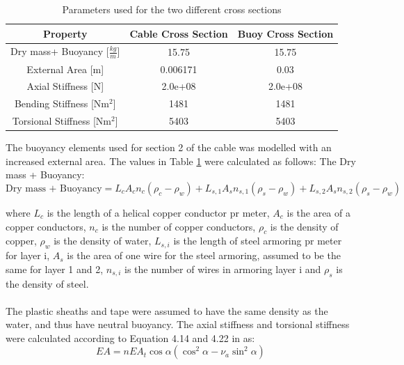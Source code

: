 \begin{table} [H]
\centering
\begin{tabular}{ |c|c|c|}
\hline
Property& Cable Cross Section & Buoy Cross Section \\
 \hline
 \hline
Dry mass+ Buoyancy [$\frac{kg}{m}$] & 15.75 & 15.75\\
External Area [m]& 0.006171 & 0.03\\
Axial Stiffness [N] & 2.0e+08 & 2.0e+08\\
Bending Stiffness [Nm$^2$] & 1481 & 1481\\
Torsional Stiffness [Nm$^2$] & 5403 & 5403\\
 \hline
\end{tabular}
\caption{Parameters used for the two different cross sections}
\label{table:crosssima}
\end{table}
\noindent The buoyancy elements used for section 2 of the cable was modelled with an increased external area. The values in Table \ref{table:crosssima} were calculated as follows:\newline
\newline 
\noindent The Dry mass + Buoyancy: 
\begin{equation}
\text{Dry mass + Buoyancy}=L_{c} A_cn_c (\rho_c-\rho_w) + L_{s,1} A_{s}n_{s,1} (\rho_s-\rho_w)+L_{s,2} A_{s}n_{s,2} (\rho_s-\rho_w)
\end{equation}

\noindent where $L_c$ is the length of a helical copper conductor pr meter, $A_c$ is the area of a copper conductors, $n_c$ is the number of copper conductors, $\rho_c$ is the density of copper, $\rho_w$ is the density of water, $L_{s,i}$ is the length of steel armoring pr meter for layer i, $A_s$ is the area of one wire for the steel armoring, assumed to be the same for layer 1 and 2, $n_{s,i}$ is the number of wires in armoring layer i and $\rho_s$ is the density of steel.\\\\ The plastic sheaths and tape were assumed to have the same density as the water, and thus have neutral buoyancy. \newline
\newline 
The axial stiffness and torsional stiffness were calculated according to Equation 4.14 and 4.22 in \cite{Savik2016} as:
\begin{equation}
    EA=nEA_t \cos\alpha(\cos^2\alpha-\nu_a \sin^2\alpha)
\end{equation}

